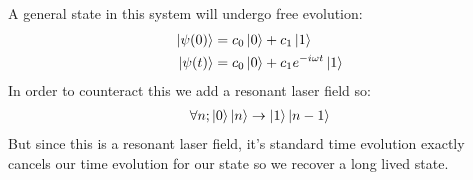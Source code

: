A general state in this system will undergo free evolution:
\begin{align*}
	\ket{\psi(0)} &= c_0 \ket{0} + c_1\ket{1} \\
	\ket{\psi(t)} &= c_0\ket{0} + c_1 e^{-i\omega t}\ket{1}
\end{align*}
In order to counteract this we add a resonant laser field so:
\begin{align*}
	\forall n; \ket{0}\ket{n}\to\ket{1}\ket{n-1}
\end{align*}
But since this is a resonant laser field, it's standard time evolution exactly cancels our time evolution for our state so we recover a long lived state.
